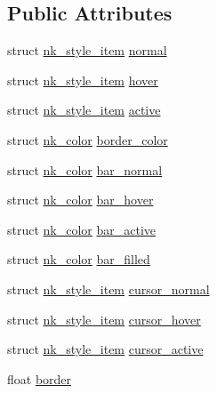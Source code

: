 \subsection*{Public Attributes}
\begin{DoxyCompactItemize}
\item 
struct \mbox{\hyperlink{structnk__style__item}{nk\+\_\+style\+\_\+item}} \mbox{\hyperlink{structnk__style__slider_a338ae8754fc7997abbca126b60668c6a}{normal}}
\item 
struct \mbox{\hyperlink{structnk__style__item}{nk\+\_\+style\+\_\+item}} \mbox{\hyperlink{structnk__style__slider_a9f36bc9ca0a52499e74f486e7a1b4f32}{hover}}
\item 
struct \mbox{\hyperlink{structnk__style__item}{nk\+\_\+style\+\_\+item}} \mbox{\hyperlink{structnk__style__slider_a9f85ea5ee0d952cc5d1e8dfcf06d09b6}{active}}
\item 
struct \mbox{\hyperlink{structnk__color}{nk\+\_\+color}} \mbox{\hyperlink{structnk__style__slider_a28182ddaeb0272101a4b484e8900c6db}{border\+\_\+color}}
\item 
struct \mbox{\hyperlink{structnk__color}{nk\+\_\+color}} \mbox{\hyperlink{structnk__style__slider_a1dc33f2a1593baa9cb1915035ef50ce7}{bar\+\_\+normal}}
\item 
struct \mbox{\hyperlink{structnk__color}{nk\+\_\+color}} \mbox{\hyperlink{structnk__style__slider_a4beff8f720775d999ec7418f2424fc8e}{bar\+\_\+hover}}
\item 
struct \mbox{\hyperlink{structnk__color}{nk\+\_\+color}} \mbox{\hyperlink{structnk__style__slider_a4234c3fd7dd2300c4c27d499eea7eb62}{bar\+\_\+active}}
\item 
struct \mbox{\hyperlink{structnk__color}{nk\+\_\+color}} \mbox{\hyperlink{structnk__style__slider_aa0771bad7fb36018adad50913744dc34}{bar\+\_\+filled}}
\item 
struct \mbox{\hyperlink{structnk__style__item}{nk\+\_\+style\+\_\+item}} \mbox{\hyperlink{structnk__style__slider_a2029307fad5395d90ee585439583211e}{cursor\+\_\+normal}}
\item 
struct \mbox{\hyperlink{structnk__style__item}{nk\+\_\+style\+\_\+item}} \mbox{\hyperlink{structnk__style__slider_ae0045253c289dd775ba8fabf2b3b6761}{cursor\+\_\+hover}}
\item 
struct \mbox{\hyperlink{structnk__style__item}{nk\+\_\+style\+\_\+item}} \mbox{\hyperlink{structnk__style__slider_a110cadbf1de8a0830ea5da3e9d64563c}{cursor\+\_\+active}}
\item 
float \mbox{\hyperlink{structnk__style__slider_af2bb87b4b87a6e3d2663e2d3a64285dd}{border}}

\end{DoxyCompactItemize}
